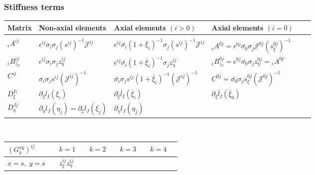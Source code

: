 \subsubsection{Stiffness terms}\label{section:stiffness}
%
\begin{table*}
\begin{minipage}{156mm}
\begin{center}
\caption{Definitions for precomputable matrices of the stiffness term
($\epsilon=\lambda,~\mu$ or any combination thereof).}
\label{table:precomp}
\begin{tabular}{@{}llllll}
\hline\hline
Matrix & Non-axial elements & Axial elements $(i>0)$ & Axial elements $(i=0)$\\
\hline\\
${}_{\epsilon}{A}^{ij}$  &
$\epsilon^{ij}\sigma_i\sigma_j (s^{ij})^{-1}{\mathcal J}^{ij}$ &
$\epsilon^{ij}
\bar{\sigma_i}(1+\bar{\xi}_i)^{-1}\sigma_j (s^{ij})^{-1}{\mathcal J}^{ij}$ &
${}_\epsilon{A}^{0j}=\epsilon^{0j}
\bar{\sigma_0} \sigma_j {\mathcal J}^{0j}(s_\xi^{0j})^{-1}$ \\[10pt]
${}_\epsilon{B}_{z_\eta}^{ij}$ &
$\epsilon^{ij}\sigma_i\sigma_j z_\eta^{ij}$ &
$\epsilon^{ij}\bar{\sigma_i}(1+\bar{\xi}_i)^{-1}\sigma_j z_\eta^{ij}$ &
${}_\epsilon{B}^{0j}_{z_\eta}=\epsilon^{0j}
\bar{\sigma_0}\sigma_j z_\eta^{0j}={}_\epsilon{A}^{0j}   $ \\[10pt]
$C^{ij}$ &
$\sigma_i\sigma_j s^{ij} ({\mathcal J}^{ij})^{-1}$ &
$\bar{\sigma_i}\sigma_js^{ij}(1+\bar{\xi}_i)^{-1} ({\mathcal J}^{ij})^{-1}$ &
$C^{0j}=\bar{\sigma_0}\sigma_js_\xi^{0j} ({\mathcal J}^{0j})^{-1}$ \\[10pt]
$D_{\xi}^{Ii}$ &
$\partial_\xi l_I(\xi_i)$ &
$\partial_\xi \bar{l}_I(\bar{\xi}_i)$ &
$\partial_\xi \bar{l}_I(\bar{\xi}_0)$ \\[10pt]
$D_{\eta}^{Jj}$ &
$\partial_\eta l_J(\eta_j)=\partial_\xi l_J(\xi_j)$ &
$\partial_\eta l_J(\eta_j)$ & \\[5pt]
%
\hline\hline
\end{tabular}
%
\vspace{0.2cm}\\
\begin{tabular}{@{}llllll}
$(G_k^{xy})^{ij}$ &$\hspace{1em} k=1$ &$\hspace{1em} k=2$ &$\hspace{1em} k=3 $
&$\hspace{1em} k=4$ \\
\hline\vspace{0.1cm}
$x=s,\; y=s$ &$\hspace{1em} z_\xi^{ij} z_\eta^{ij} $

\end{tabular}
\end{center}
\end{minipage}
\end{table*}
